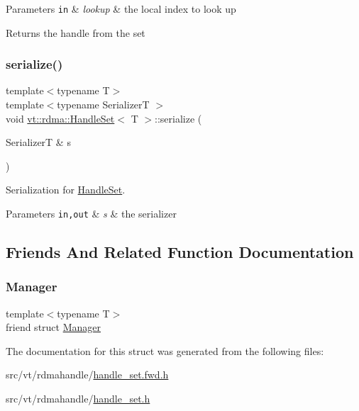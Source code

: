 \begin{DoxyParams}[1]{Parameters}
\mbox{\tt in}  & {\em lookup} & the local index to look up\\
\hline
\end{DoxyParams}
\begin{DoxyReturn}{Returns}
the handle from the set 
\end{DoxyReturn}
\mbox{\label{structvt_1_1rdma_1_1_handle_set_a4a78a0c0e54d6044676c560c00fba248}} 
\subsubsection{\texorpdfstring{serialize()}{serialize()}}
{\footnotesize\ttfamily template$<$typename T$>$ \\
template$<$typename SerializerT $>$ \\
void \hyperlink{structvt_1_1rdma_1_1_handle_set}{vt\+::rdma\+::\+Handle\+Set}$<$ T $>$\+::serialize (\begin{DoxyParamCaption}\item[{SerializerT \&}]{s }\end{DoxyParamCaption})\hspace{0.3cm}{\ttfamily [inline]}}



Serialization for {\ttfamily \hyperlink{structvt_1_1rdma_1_1_handle_set}{Handle\+Set}}. 


\begin{DoxyParams}[1]{Parameters}
\mbox{\tt in,out}  & {\em s} & the serializer \\
\hline
\end{DoxyParams}


\subsection{Friends And Related Function Documentation}
\mbox{\label{structvt_1_1rdma_1_1_handle_set_a1fd6b9bc3f72bb2b64e602de3982929d}} 
\subsubsection{\texorpdfstring{Manager}{Manager}}
{\footnotesize\ttfamily template$<$typename T$>$ \\
friend struct \hyperlink{structvt_1_1rdma_1_1_manager}{Manager}\hspace{0.3cm}{\ttfamily [friend]}}



The documentation for this struct was generated from the following files\+:\begin{DoxyCompactItemize}
\item 
src/vt/rdmahandle/\hyperlink{handle__set_8fwd_8h}{handle\+\_\+set.\+fwd.\+h}\item 
src/vt/rdmahandle/\hyperlink{handle__set_8h}{handle\+\_\+set.\+h}\end{DoxyCompactItemize}
